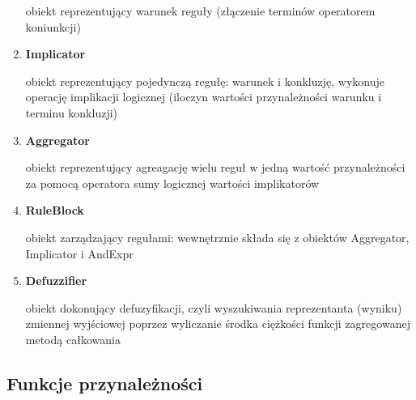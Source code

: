 \documentclass{article}
\begin{document}
\begin{enumerate}
  obiekt reprezentujący warunek reguły (złączenie terminów operatorem koniunkcji)

\item \textbf{Implicator}

  obiekt reprezentujący pojedynczą regułę: warunek i konkluzję, wykonuje
  operację implikacji logicznej (iloczyn wartości przynależności warunku i
  terminu konkluzji)

\item \textbf{Aggregator}

  obiekt reprezentujący agreagację wielu reguł w jedną wartość przynależności
  za pomocą operatora sumy logicznej wartości implikatorów

\item \textbf{RuleBlock}

  obiekt zarządzający regułami: wewnętrznie składa się z obiektów Aggregator,
  Implicator i AndExpr

\item \textbf{Defuzzifier}

  obiekt dokonujący defuzyfikacji, czyli wyszukiwania reprezentanta (wyniku) zmiennej
  wyjściowej poprzez wyliczanie środka ciężkości funkcji zagregowanej metodą całkowania

\end{enumerate}

\subsection {Funkcje przynależności}
\end{document}
